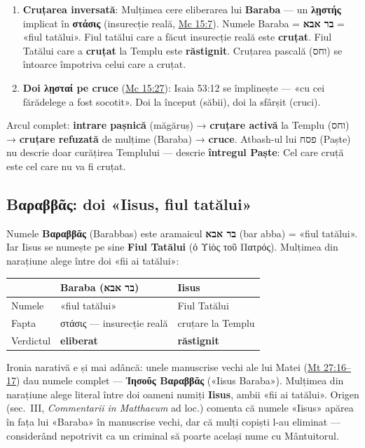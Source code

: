 \documentclass[12pt,a4paper,twoside,openany]{book}
\begin{document}
\begin{enumerate}
  \item \textbf{Cruțarea inversată}: Mulțimea cere eliberarea lui \textbf{Baraba} — un \textbf{λῃστής} implicat în \textbf{στάσις} (insurecție reală, \href{https://bibliaortodoxa.ro/carte.php?id=53\&cap=15\#7}{Mc 15:7}). Numele Baraba = \textbf{בר אבא} = «fiul tatălui». Fiul tatălui care a făcut insurecție reală este \textbf{cruțat}. Fiul Tatălui care a \textbf{cruțat} la Templu este \textbf{răstignit}. Cruțarea pascală (וחס) se întoarce împotriva celui care a cruțat.
  \item \textbf{Doi λῃσταί pe cruce} (\href{https://bibliaortodoxa.ro/carte.php?id=53\&cap=15\#27}{Mc 15:27}): Isaia 53:12 se împlinește — «cu cei fărădelege a fost socotit». Doi la început (săbii), doi la sfârșit (cruci).
\end{enumerate}

Arcul complet: \textbf{intrare pașnică} (măgăruș) → \textbf{cruțare activă} la Templu (וחס) → \textbf{cruțare refuzată} de mulțime (Baraba) → \textbf{cruce}. Atbash-ul lui פסח (Paște) nu descrie doar curățirea Templului — descrie \textbf{întregul Paște}: Cel care cruță este cel care nu va fi cruțat.

\subsection{Βαραββᾶς: doi «Iisus, fiul tatălui»}

Numele \textbf{Βαραββᾶς} (Barabbas) este aramaicul \textbf{בר אבא} (bar abba) = «fiul tatălui». Iar Iisus se numește pe sine \textbf{Fiul Tatălui} (ὁ Υἱὸς τοῦ Πατρός). Mulțimea din narațiune alege între doi «fii ai tatălui»:

\begin{center}
\small
\begin{tabularx}{\textwidth}{L{3.5cm}L{5cm}X}
\toprule
{}
& \textbf{Baraba} (בר אבא) & \textbf{Iisus} \\
\midrule
Numele & «fiul tatălui» & Fiul Tatălui \\
Fapta & στάσις — insurecție reală & cruțare la Templu \\
Verdictul & \textbf{eliberat} & \textbf{răstignit} \\
\bottomrule
\end{tabularx}
\end{center}

Ironia narativă e și mai adâncă: unele manuscrise vechi ale lui Matei (\href{https://bibliaortodoxa.ro/carte.php?id=55\&cap=27\#16}{Mt 27:16--17}) dau numele complet — \textbf{Ἰησοῦς Βαραββᾶς} («Iisus Baraba»). Mulțimea din narațiune alege literal între doi oameni numiți \textbf{Iisus}, ambii «fii ai tatălui». Origen (sec.~III, \textit{Commentarii in Matthaeum} ad loc.) comenta că numele «Iisus» apărea în fața lui «Baraba» în manuscrise vechi, dar că mulți copiști l-au eliminat — considerând nepotrivit ca un criminal să poarte același nume cu Mântuitorul.
\end{document}
